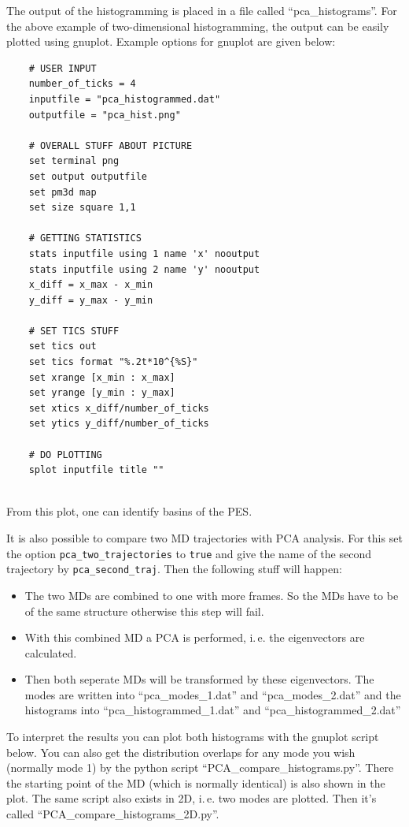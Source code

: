 \documentclass[10pt,a4paper]{article} %
\begin{document}
	 The output of the histogramming is placed in a file called ``pca\_histograms''. For the above example of two-dimensional histogramming, the output can be easily plotted using gnuplot\cite{gnuplot_4.4}. Example options for gnuplot are given below:\\
	 \begin{lstlisting}
	# USER INPUT
	number_of_ticks = 4
	inputfile = "pca_histogrammed.dat"
	outputfile = "pca_hist.png"   
	
	# OVERALL STUFF ABOUT PICTURE
	set terminal png
	set output outputfile
	set pm3d map
	set size square 1,1
	
	# GETTING STATISTICS
	stats inputfile using 1 name 'x' nooutput
	stats inputfile using 2 name 'y' nooutput
	x_diff = x_max - x_min
	y_diff = y_max - y_min
	
	# SET TICS STUFF
	set tics out
	set tics format "%.2t*10^{%S}"
	set xrange [x_min : x_max]
	set yrange [y_min : y_max]
	set xtics x_diff/number_of_ticks
	set ytics y_diff/number_of_ticks
	
	# DO PLOTTING
	splot inputfile title ""\end{lstlisting}~\\	
	
	From this plot, one can identify basins of the \acl{PES}. 
	
	
	It is also possible to compare two MD trajectories with PCA analysis. For this set the option \texttt{pca\_two\_trajectories} to \texttt{true} and give the name of the second trajectory by \texttt{pca\_second\_traj}. Then the following stuff will happen:
	\begin{itemize}
		\item The two MDs are combined to one with more frames. So the MDs have to be of the same structure otherwise this step will fail.
		\item With this combined MD a PCA is performed, i.\,e. the eigenvectors are calculated.
		\item Then both seperate MDs will be transformed by these eigenvectors. The modes are written into ``pca\_modes\_1.dat'' and ``pca\_modes\_2.dat'' and the histograms into ``pca\_histogrammed\_1.dat'' and ``pca\_histogrammed\_2.dat''
	\end{itemize}
    To interpret the results you can plot both histograms with the gnuplot script below. You can also get the distribution overlaps for any mode you wish (normally mode 1) by the python script ``PCA\_compare\_histograms.py''. There the starting point of the MD (which is normally identical) is also shown in the plot. The same script also exists in 2D, i.\,e. two modes are plotted. Then it's called ``PCA\_compare\_histograms\_2D.py''. 
	
\end{document}
